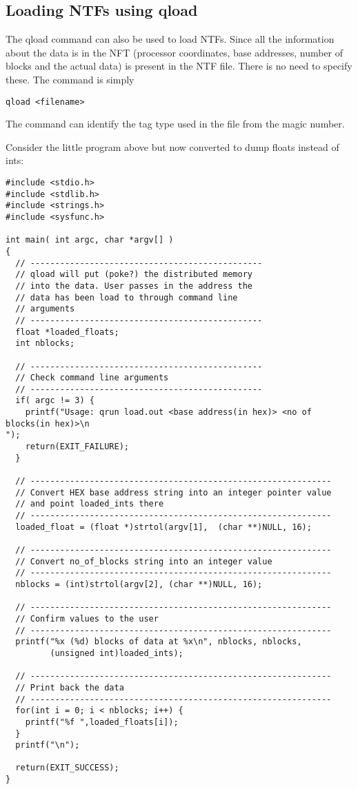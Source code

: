\subsection{Loading NTFs using qload}
The qload command can also be used to load NTFs. Since all the information
about the data is in the NFT (processor coordinates, base addresses, number of blocks and the actual data) is present in the NTF file. There is no need
to specify these. The command is simply
\begin{verbatim}
qload <filename>
\end{verbatim}
The command can identify the tag type used in the file from the magic number.

Consider the little program above but now converted to dump floats instead 
of ints:
{\scriptsize
\begin{verbatim}
#include <stdio.h>
#include <stdlib.h>
#include <strings.h>
#include <sysfunc.h>

int main( int argc, char *argv[] )
{
  // -----------------------------------------------
  // qload will put (poke?) the distributed memory
  // into the data. User passes in the address the
  // data has been load to through command line
  // arguments
  // -----------------------------------------------
  float *loaded_floats;
  int nblocks;

  // -----------------------------------------------
  // Check command line arguments
  // -----------------------------------------------
  if( argc != 3) {
    printf("Usage: qrun load.out <base address(in hex)> <no of blocks(in hex)>\n
");
    return(EXIT_FAILURE);
  }

  // -------------------------------------------------------------
  // Convert HEX base address string into an integer pointer value
  // and point loaded_ints there
  // -------------------------------------------------------------
  loaded_float = (float *)strtol(argv[1],  (char **)NULL, 16);

  // -------------------------------------------------------------
  // Convert no_of_blocks string into an integer value
  // -------------------------------------------------------------
  nblocks = (int)strtol(argv[2], (char **)NULL, 16);

  // -------------------------------------------------------------
  // Confirm values to the user
  // -------------------------------------------------------------
  printf("%x (%d) blocks of data at %x\n", nblocks, nblocks,
         (unsigned int)loaded_ints);

  // -------------------------------------------------------------
  // Print back the data
  // -------------------------------------------------------------
  for(int i = 0; i < nblocks; i++) {
    printf("%f ",loaded_floats[i]);
  }
  printf("\n");

  return(EXIT_SUCCESS);
}
\end{verbatim}
}

